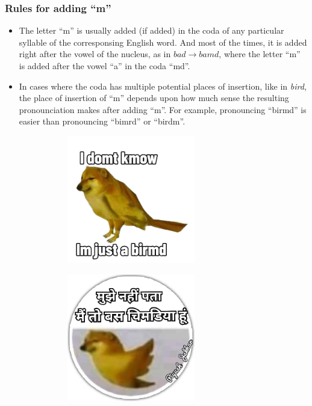 \def\DevnagVersion{2.17}\documentclass{article}
\begin{document}
\subsubsection{Rules for adding ``m''}
\begin{itemize}
    \item The letter ``m'' is usually added (if added) in the coda of any particular syllable of the corresponsing English word. And most of the times, it is added right after the vowel of the nucleus, as in $bad \to bamd$, where the letter ``m'' is added after the vowel ``a'' in the coda ``md''.

    \item In cases where the coda has multiple potential places of insertion, like in \textit{bird}, the place of insertion of ``m'' depends upon how much sense the resulting pronounciation makes after adding ``m''. For example, pronouncing ``birmd'' is easier than pronouncing ``bimrd'' or ``birdm''.
          \begin{figure}[H]
              \centering
              \begin{subfigure}{0.45\textwidth}
                  \centering
                  \includegraphics[width=0.66\textwidth]{figures/birmdie.png}
              \end{subfigure}
              \begin{subfigure}{0.45\textwidth}
                  \centering
                  \includegraphics[width=0.66\textwidth]{figures/birmdie_hindi.png}

\end{subfigure}
\end{figure}
\end{itemize}
\end{document}

